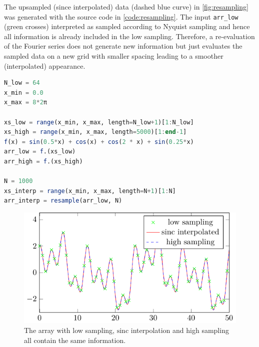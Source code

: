 \documentclass{juliacon}
\def\sinc{\mathrm{sinc}}
\def\lc{\lstinline}
\begin{document}
        The upsampled (since interpolated) data (dashed blue curve) in \autoref{fig:resampling} was generated with the source code in \autoref{code:resampling}. The input \lc{arr_low} (green crosses) interpreted as sampled according to Nyquist sampling and hence all information is already included in the low sampling.
        Therefore, a re-evaluation of the Fourier series does not generate new information but
        just evaluates the sampled data on a new grid with smaller spacing leading
        to a smoother (interpolated) appearance.

\begin{lstlisting}[language=Julia, label={code:resampling}, caption={Resampling of a Nyquist sampled signal.}, captionpos=b] 
N_low = 64
x_min = 0.0 
x_max = 8*2π

xs_low = range(x_min, x_max, length=N_low+1)[1:N_low]
xs_high = range(x_min, x_max, length=5000)[1:end-1]
f(x) = sin(0.5*x) + cos(x) + cos(2 * x) + sin(0.25*x)
arr_low = f.(xs_low)
arr_high = f.(xs_high)

N = 1000
xs_interp = range(x_min, x_max, length=N+1)[1:N]
arr_interp = resample(arr_low, N)
\end{lstlisting}

         \begin{figure}[h]
             \centering
             \includegraphics[width=.45\textwidth]{figures/resampling.pdf}
             \caption{The array with low sampling, $\sinc$ interpolation and high sampling all contain the same information.}
             \label{fig:resampling}
         \end{figure}
    

    
\end{document}
